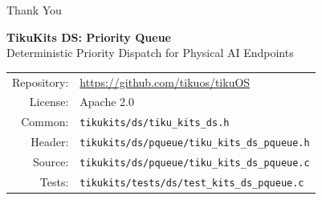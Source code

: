 \documentclass[aspectratio=169, 10pt]{beamer}
\begin{document}
\begin{frame}{Thank You}
\begin{center}
\Large\textbf{TikuKits DS: Priority Queue}\\[0.5em]
\normalsize Deterministic Priority Dispatch for Physical AI Endpoints\\[1.5em]

\begin{tabular}{rl}
  Repository: & \url{https://github.com/tikuos/tikuOS} \\
  License:    & Apache 2.0 \\
  Common:     & \texttt{tikukits/ds/tiku\_kits\_ds.h} \\
  Header:     & \texttt{tikukits/ds/pqueue/tiku\_kits\_ds\_pqueue.h} \\
  Source:     & \texttt{tikukits/ds/pqueue/tiku\_kits\_ds\_pqueue.c} \\
  Tests:      & \texttt{tikukits/tests/ds/test\_kits\_ds\_pqueue.c} \\
\end{tabular}
\end{center}
\end{frame}
\end{document}
